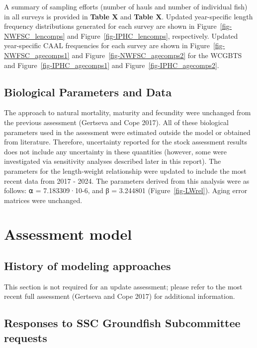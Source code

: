 \documentclass[
]{scrartcl}
\begin{document}
A summary of sampling efforts (number of hauls and number of individual
fish) in all surveys is provided in \textbf{Table X} and \textbf{Table
X}. Updated year-specific length frequency distributions generated for
each survey are shown in Figure~\ref{fig-NWFSC_lencomps} and
Figure~\ref{fig-IPHC_lencomps}, respectively. Updated year-specific CAAL
frequencies for each survey are shown in
Figure~\ref{fig-NWFSC_agecomps1} and Figure~\ref{fig-NWFSC_agecomps2}
for the WCGBTS and Figure~\ref{fig-IPHC_agecomps1} and
Figure~\ref{fig-IPHC_agecomps2}.

\subsection{Biological Parameters and
Data}\label{biological-parameters-and-data}

The approach to natural mortality, maturity and fecundity were unchanged
from the previous assessment (Gertseva and Cope 2017). All of these
biological parameters used in the assessment were estimated outside the
model or obtained from literature. Therefore, uncertainty reported for
the stock assessment results does not include any uncertainty in these
quantities (however, some were investigated via sensitivity analyses
described later in this report). The parameters for the length-weight
relationship were updated to include the most recent data from 2017 -
2024. The parameters derived from this analysis were as follows: ⍺ =
7.183309·10-6, and β = 3.244801 (Figure~\ref{fig-LWrel}). Aging error
matrices were unchanged.

\newpage{}

\section{Assessment model}\label{assessment-model}

\subsection{History of modeling
approaches}\label{history-of-modeling-approaches}

This section is not required for an update assessment; please refer to
the most recent full assessment (Gertseva and Cope 2017) for additional
information.

\subsection{Responses to SSC Groundfish Subcommittee
requests}\label{responses-to-ssc-groundfish-subcommittee-requests}
\end{document}
